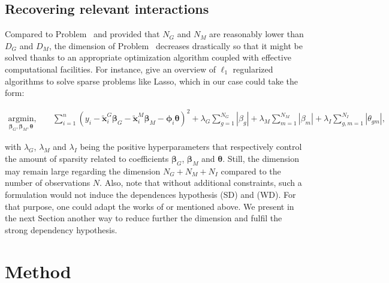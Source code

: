 \documentclass[]{book}
\begin{document}
\hypertarget{recoverinteractions}{%
\subsection{Recovering relevant interactions}\label{recoverinteractions}}

Compared to Problem~ and provided that \(N_\mathit{G}\) and \(N_\mathit{M}\) are
reasonably lower than \(D_{\mathit{G}}\) and \(D_{\mathit{M}}\), the dimension of Problem~
decreases drastically so that it might be solved thanks to an
appropriate optimization algorithm coupled with effective computational
facilities. For instance, \citep{DT:IEEEIT2008} give an overview of \(\ell_1\)
regularized algorithms to solve sparse problems like Lasso, which in our
case could take the form:

\[\begin{aligned}
  \underset{\boldsymbol{\beta}_{\mathit{G}}, \boldsymbol{\beta}_{\mathit{M}}, \boldsymbol{\theta}}{\text{argmin}},
  & \quad \sum_{i=1}^n \left(y_i - \tilde{\mathbf{x}}_{i}^{\mathit{G}} \boldsymbol{\beta}_{\mathit{G}} -
    \tilde{\mathbf{x}}_{i}^{\mathit{M}}  \boldsymbol{\beta}_{\mathit{M}}  - \boldsymbol{\phi}_{i}  \boldsymbol{\theta} \right)^2 + \lambda_{\mathit{G}} \sum_{g=1}^{N_{\mathit{G}}}|\beta_{g}| + \lambda_{\mathit{M}} \sum_{m=1}^{N_{\mathit{M}}} |\beta_{m}|  +  \lambda_I \sum_{g,m=1}^{N_I}  |\theta_{gm}|, \end{aligned}\]

with \(\lambda_\mathit{G}\), \(\lambda_\mathit{M}\) and \(\lambda_I\) being the positive
hyperparameters that respectively control the amount of sparsity related
to coefficients \(\boldsymbol{\beta}_\mathit{G}\), \(\boldsymbol{\beta}_\mathit{M}\) and \(\boldsymbol{\theta}\). Still, the
dimension may remain large regarding the dimension \(N_\mathit{G} + N_\mathit{M} + N_I\)
compared to the number of observations \(N\). Also, note that without
additional constraints, such a formulation would not induce the
dependences hypothesis (SD) and (WD). For that purpose, one could adapt
the works of \citep{bien2013lasso, lim2015learning} or \citep{she2016group}
mentioned above. We present in the next Section another way to reduce
further the dimension and fulfil the strong dependency hypothesis.

\hypertarget{implementation}{%
\section{Method}\label{implementation}}
\end{document}
